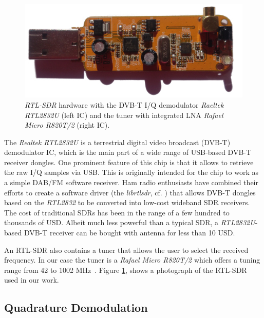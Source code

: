 \documentclass[conference]{IEEEtran}
\begin{document}
\begin{figure}[h]
				\centering
				\includegraphics[width=0.5\columnwidth]{./fig/rtlsdr.jpg}
				\caption{\textit{RTL-SDR} hardware with the DVB-T I/Q
				demodulator \textit{Raeltek RTL2832U} (left IC) and the tuner
				with integrated LNA \textit{Rafael Micro R820T/2} (right IC).} 
				\label{fig:receiver_arch}
\end{figure}
The \textit{Realtek RTL2832U} is a terrestrial digital video broadcast
(DVB-T) demodulator IC, which is the main part of a wide range of
USB-based DVB-T receiver dongles. One prominent feature of this chip is
that it allows to retrieve the raw I/Q samples via USB. This is
originally intended for the chip to work as a simple DAB/FM software
receiver. Ham radio enthusiasts have combined their efforts to create a
software driver (the \textit{librtlsdr}, cf. \cite{steve-m_librtlsdr})
that allows DVB-T dongles based on the \textit{RTL2832} to be converted
into low-cost wideband SDR receivers. The cost of traditional SDRs has
been in the range of a few hundred to thousands of USD. Albeit much less
powerful than a typical SDR, a \textit{RTL2832U}-based DVB-T receiver
can be bought with antenna for less than 10 USD.  

An RTL-SDR also contains a tuner that allows the user to select the
received frequency.  In our case the tuner is a \textit{Rafael Micro
R820T/2} which offers a tuning range from 42 to 1002
MHz~\cite{rafael_r820t_2011}. Figure \ref{fig:receiver_arch}, shows a
photograph of the RTL-SDR used in our work. 

\subsection{Quadrature Demodulation}
\end{document}
